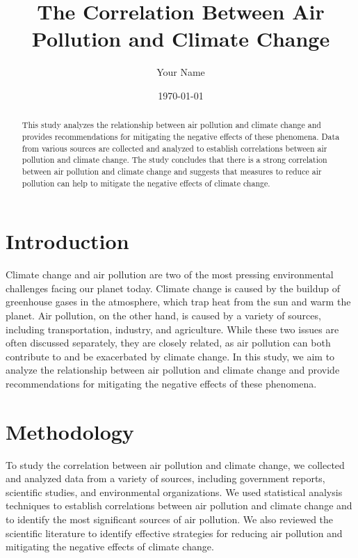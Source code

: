 \documentclass[12pt]{article}
\title{The Correlation Between Air Pollution and Climate Change}
\author{Your Name}
\date{\today}
\begin{document}
\maketitle

\begin{abstract}
This study analyzes the relationship between air pollution and climate change and provides recommendations for mitigating the negative effects of these phenomena. Data from various sources are collected and analyzed to establish correlations between air pollution and climate change. The study concludes that there is a strong correlation between air pollution and climate change and suggests that measures to reduce air pollution can help to mitigate the negative effects of climate change.
\end{abstract}

\section{Introduction}
Climate change and air pollution are two of the most pressing environmental challenges facing our planet today. Climate change is caused by the buildup of greenhouse gases in the atmosphere, which trap heat from the sun and warm the planet. Air pollution, on the other hand, is caused by a variety of sources, including transportation, industry, and agriculture. While these two issues are often discussed separately, they are closely related, as air pollution can both contribute to and be exacerbated by climate change. In this study, we aim to analyze the relationship between air pollution and climate change and provide recommendations for mitigating the negative effects of these phenomena.

\section{Methodology}
To study the correlation between air pollution and climate change, we collected and analyzed data from a variety of sources, including government reports, scientific studies, and environmental organizations. We used statistical analysis techniques to establish correlations between air pollution and climate change and to identify the most significant sources of air pollution. We also reviewed the scientific literature to identify effective strategies for reducing air pollution and mitigating the negative effects of climate change.

\end{document}
